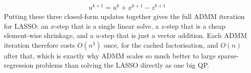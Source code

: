 \documentclass[a4paper, 11pt]{article}
\begin{document}
\begin{solution}
\begin{align*}
    \boxed{u^{k+1}=u^k+x^{k+1}-z^{k+1}}
\end{align*}
Putting these three closed-form updates together gives the full ADMM iteration for LASSO: an $x$-step that is a single linear solve, a $z$-step that is a cheap element-wise shrinkage, and a $u$-step that is just a vector addition. Each ADMM iteration therefore costs $O(n^3)$ once, for the cached factorisation, and $O(n)$ after that, which is exactly why ADMM scales so much better to large sparse-regression problems than solving the LASSO directly as one big QP.
\end{solution}
\problemend
\end{document}

